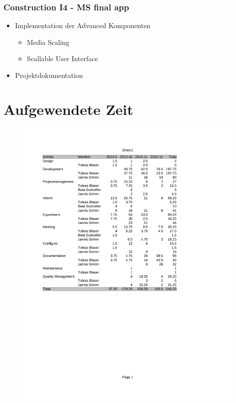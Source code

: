 		\subsubsection{Construction I4 - MS final app}
			\begin{itemize}
				\item Implementation der Advanced Komponenten
					\begin{itemize}
						\item Media Scaling
						\item Scallable User Interface
					\end{itemize}
				\item Projektdokumentation
			\end{itemize}
		
		
		\begin{landscape}
			
		\end{landscape}
		\begin{landscape}
			
		\end{landscape}
		\begin{landscape}
			
		\end{landscape}
		
		
	\section{Aufgewendete Zeit}
		\begin{figure}[H]
			\centering
			\includegraphics[trim=1.75cm 10cm 5.5cm 2.5cm, clip=true,page=1,width=\textwidth]{../projektplan/media/timelog.pdf}
		\end{figure}